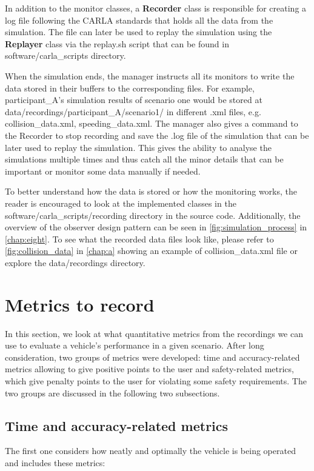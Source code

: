 In addition to the monitor classes, a \textbf{Recorder} class is responsible for creating a log file following the CARLA standards that holds all the data from the simulation. The file can later be used to replay the simulation using the \textbf{Replayer} class via the replay.sh script that can be found in {software/carla\_scripts} directory. 

When the simulation ends, the manager instructs all its monitors to write the data stored in their buffers to the corresponding files. For example, participant\_A's simulation results of scenario one would be stored at data/recordings/participant\_A/scenario1/ in different .xml files, e.g. collision\_data.xml, speeding\_data.xml. The manager also gives a command to the Recorder to stop recording and save the .log file of the simulation that can be later used to replay the simulation. This gives the ability to analyse the simulations multiple times and thus catch all the minor details that can be important or monitor some data manually if needed.

To better understand how the data is stored or how the monitoring works, the reader is encouraged to look at the implemented classes in the software/carla\_scripts/recording directory in the source code. Additionally, the overview of the observer design pattern can be seen in \autoref{fig:simulation_process} in \autoref{chap:eight}. To see what the recorded data files look like, please refer to \autoref{fig:collision_data} in \autoref{chap:a} showing an example of collision\_data.xml file or explore the data/recordings directory.


\section{Metrics to record} \label{sect-6.2}
In this section, we look at what quantitative metrics from the recordings we can use to evaluate a vehicle's performance in a given scenario. After long consideration, two groups of metrics were developed: time and accuracy-related metrics allowing to give positive points to the user and safety-related metrics, which give penalty points to the user for violating some safety requirements. The two groups are discussed in the following two subsections.

\subsection{Time and accuracy-related metrics} \label{sect-6.2.1}
The first one considers how neatly and optimally the vehicle is being operated and includes these metrics:

